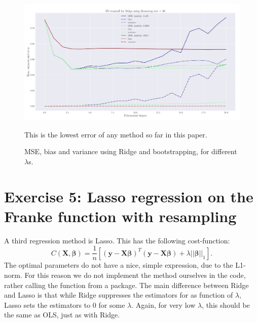 \documentclass[reprint,english,notitlepage,aps,nobalancelastpage,nofootinbib]{revtex4-1}  %
\begin{document}
\begin{figure}[h]
	\includegraphics[width=\linewidth]{LBVT_Ridge_Bootstrap_n30_eps0_2_p20_lmbm8_2.pdf}
	\caption{MSE, bias and variance using Ridge and bootstrapping, for different $\lambda$s.}
	\label{fig:Ridge_boot_BVT}This is the lowest error of any method so far in this paper.
\end{figure}




\section*{Exercise 5: Lasso regression on the Franke function with resampling}

A third regression method is Lasso. This has the following cost-function:
\begin{equation*}
	C(\mathbf{X}, \boldsymbol{\beta}) = \frac{1}{n}\left[\left(\mathbf{y}-\mathbf{X}\boldsymbol\beta \right)^T \left(\mathbf{y}-\mathbf{X}\boldsymbol\beta \right)+\lambda ||\boldsymbol{\beta}||_1 \right].
\end{equation*}
The optimal parameters do not have a nice, simple expression, due to the L1-norm. For this reason we do not implement the method ourselves in the code, rather calling the function from a package.  The main difference between Ridge and Lasso is that while Ridge suppresses the estimators for as function of $\lambda$, Lasso sets the estimators to 0 for some $\lambda$. Again, for very low $\lambda$, this should be the same as OLS, just as with Ridge.
\end{document}
